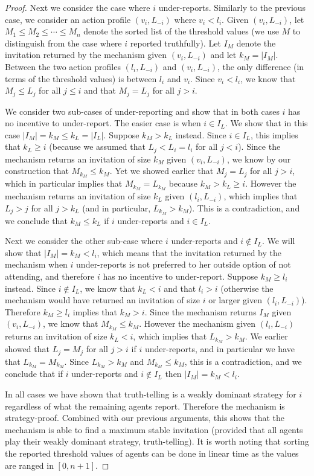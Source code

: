 \begin{proof}
	Next we consider the case where $i$ under-reports. Similarly to the previous case, we consider an action profile $(v_i, L_{-i})$ where $v_i < l_i$. Given $(v_i, L_{-i})$, let $M_1 \leq M_2 \leq \cdots \leq M_{n}$ denote the sorted list of the threshold values (we use $M$ to distinguish from the case where $i$ reported truthfully). Let $I_M$ denote the invitation returned by the mechanism given $(v_i, L_{-i})$ and let $k_M = |I_M|$. Between the two action profiles $(l_i, L_{-i})$ and $(v_i, L_{-i})$, the only difference (in terms of the threshold values) is between $l_i$ and $v_i$. Since $v_i < l_i$, we know that $M_j \leq L_j$ for all $j \leq i$ and that $M_j = L_j$ for all $j > i$. 

	We consider two sub-cases of under-reporting and show that in both cases $i$ has no incentive to under-report.  The easier case is when $i \in I_L$. We show that in this case $|I_M| = k_M \leq k_L = |I_L|$. Suppose $k_M > k_L$ instead. Since $i \in I_L$, this implies that $k_L \geq i$ (because we assumed that $L_j < L_i = l_i$ for all $j < i$). Since the mechanism returns an invitation of size $k_M$ given $(v_i, L_{-i})$, we know by our construction that $M_{k_M} \leq k_M$. Yet we showed earlier that $M_j = L_j$ for all $j > i$, which in particular implies that $M_{k_M} = L_{k_M}$ because $k_M > k_L \geq i$. However the mechanism returns an invitation of size $k_L$ given $(l_i, L_{-i})$, which implies that $L_j > j$ for all $j > k_L$ (and in particular, $L_{k_M} > k_M$). This is a contradiction, and we conclude that $k_M \leq k_L$ if $i$ under-reports and $i\in I_L$. 

	Next we consider the other sub-case where $i$ under-reports and $i\not\in I_L$. We will show that $|I_M| = k_M < l_i$, which means that the invitation returned by the mechanism when $i$ under-reports is not preferred to her outside option of not attending, and therefore $i$ has no incentive to under-report. Suppose $k_M \geq l_i$ instead. Since $i \not\in I_L$, we know that $k_L < i$ and that $l_i > i$ (otherwise the mechanism would have returned an invitation of size $i$ or larger given $(l_i, L_{-i})$). Therefore $k_M \geq l_i$ implies that $k_M > i$. Since the mechanism returns $I_M$ given $(v_i, L_{-i})$, we know that $M_{k_M} \leq k_M$. However the mechanism given $(l_i, L_{-i})$ returns an invitation of size $k_L < i$, which implies that $L_{k_M} > k_M$. We earlier showed that $L_j = M_j$ for all $j > i$ if $i$ under-reports, and in particular we have that $L_{k_M} = M_{k_M}$. Since $L_{k_M} > k_M$ and $M_{k_M} \leq k_M$, this is a contradiction, and we conclude that if $i$ under-reports and $i\not\in I_L$ then $|I_M| = k_M < l_i$. 

	In all cases we have shown that truth-telling is a weakly dominant strategy for $i$ regardless of what the remaining agents report. Therefore the mechanism is strategy-proof.  Combined with our previous arguments, this shows that the mechanism is able to find a maximum stable invitation (provided that all agents play their weakly dominant strategy, truth-telling). It is worth noting that sorting the reported threshold values of agents can be done in linear time as the values are ranged in $[0, n+1]$.
\end{proof} 	 
